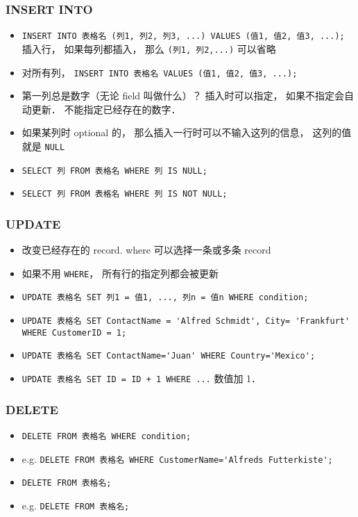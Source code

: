 \subsubsection{INSERT INTO}
\begin{itemize}
\item \verb`INSERT INTO 表格名 (列1, 列2, 列3, ...) VALUES (值1, 值2, 值3, ...);` 插入行， 如果每列都插入， 那么 \verb`(列1, 列2,...)` 可以省略
\item 对所有列， \verb`INSERT INTO 表格名 VALUES (值1, 值2, 值3, ...);`
\item 第一列总是数字（无论 field 叫做什么）？ 插入时可以指定，  如果不指定会自动更新． 不能指定已经存在的数字．
\item 如果某列时 optional 的， 那么插入一行时可以不输入这列的信息， 这列的值就是 \verb`NULL`
\item \verb`SELECT 列 FROM 表格名 WHERE 列 IS NULL;`
\item \verb`SELECT 列 FROM 表格名 WHERE 列 IS NOT NULL;`
\end{itemize}

\subsubsection{UPDATE}
\begin{itemize}
\item 改变已经存在的 record. where 可以选择一条或多条 record
\item 如果不用 \verb`WHERE`， 所有行的指定列都会被更新
\item \verb`UPDATE 表格名 SET 列1 = 值1, ..., 列n = 值n WHERE condition;`
\item \verb`UPDATE 表格名 SET ContactName = 'Alfred Schmidt', City= 'Frankfurt' WHERE CustomerID = 1;`
\item \verb`UPDATE 表格名 SET ContactName='Juan' WHERE Country='Mexico';`
\item \verb|UPDATE 表格名 SET ID = ID + 1 WHERE ...| 数值加 1．
\end{itemize}

\subsubsection{DELETE}
\begin{itemize}
\item \verb`DELETE FROM 表格名 WHERE condition;`
\item e.g. \verb`DELETE FROM 表格名 WHERE CustomerName='Alfreds Futterkiste';`
\item \verb`DELETE FROM 表格名;`
\item e.g. \verb`DELETE FROM 表格名;`
\end{itemize}

